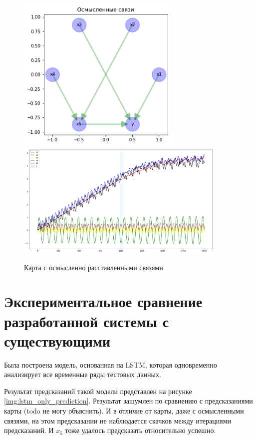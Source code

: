\begin{figure}[t]
	\centering
	\includegraphics[width=0.7\textwidth]{./img/lstmfcm_meaningful.png}
	\includegraphics[width=0.9\textwidth]{./img/lstmfcm_meaningful_prediction.png}
	\caption{Карта с осмысленно расставленными связями}
	\label{img:lstmfcm_meaningful}
\end{figure}


\section{Экспериментальное сравнение разработанной системы с существующими}

Была построена модель, основанная на LSTM,
которая одновременно анализирует все временные ряды тестовых данных.

Результат предсказаний такой модели представлен на рисунке \ref{img:lstm_only_prediction}.
Результат зашумлен по сравнению с предсказаниями карты (todo не могу объяснить).
И в отличие от карты, даже с осмысленными связями, на этом предсказании не наблюдается скачков
между итерациями предсказаний. И $ x_5 $ тоже удалось предсказать относительно успешно.

